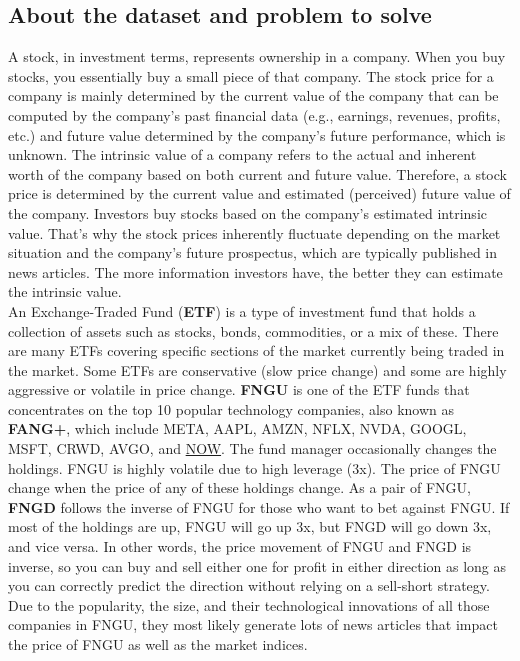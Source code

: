 \documentclass[twocolumn,12pt]{article}
\begin{document}
\begin{multicols}{2}
\begin{flushleft}
\subsection*{About the dataset and problem to solve}
A stock, in investment terms, represents ownership in a company. When you buy stocks, you essentially buy a small piece of that company. The stock price for a company is mainly determined by the current value of the company that can be computed by the company’s past financial data (e.g., earnings, revenues, profits, etc.) and future value determined by the company’s future performance, which is unknown. The intrinsic value of a company refers to the actual and inherent worth of the company based on both current and future value. Therefore, a stock price is determined by the current value and estimated (perceived) future value of the company. Investors buy stocks based on the company’s estimated intrinsic value. That’s why the stock prices inherently fluctuate depending on the market situation and the company’s future prospectus, which are typically published in news articles. The more information investors have, the better they can estimate the intrinsic value.\\
An Exchange-Traded Fund (\textbf{ETF}) is a type of investment fund that holds a collection of assets such as stocks, bonds, commodities, or a mix of these. There are many ETFs covering specific sections of the market currently being traded in the market. Some ETFs are conservative (slow price change) and some are highly aggressive or volatile in price change. \textbf{FNGU} is one of the ETF funds that concentrates on the top 10 popular technology companies, also known as \textbf{FANG+}, which include META, AAPL, AMZN, NFLX, NVDA, GOOGL, MSFT, CRWD, AVGO, and \href{https://finance.yahoo.com/quote/FNGU/holdings/}{NOW}. The fund manager occasionally changes the holdings. FNGU is highly volatile due to high leverage (3x). The price of FNGU change when the price of any of these holdings change. As a pair of FNGU, \textbf{FNGD} follows the inverse of FNGU for those who want to bet against FNGU. If most of the holdings are up, FNGU will go up 3x, but FNGD will go down 3x, and vice versa. In other words, the price movement of FNGU and FNGD is inverse, so you can buy and sell either one for profit in either direction as long as you can correctly predict the direction without relying on a sell-short strategy. Due to the popularity, the size, and their technological innovations of all those companies in FNGU, they most likely generate lots of news articles that impact the price of FNGU as well as the market indices.\\

\end{flushleft}
\end{multicols}
\end{document}
